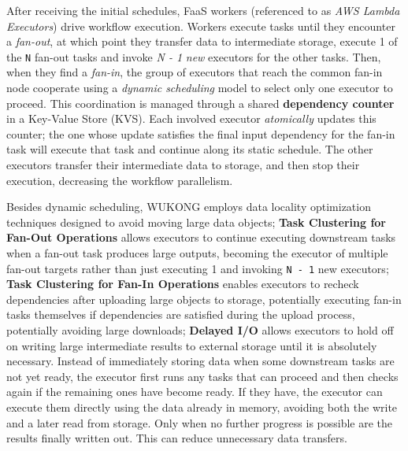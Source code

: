 \begin{itemize}
After receiving the initial schedules, FaaS workers (referenced to as \textit{AWS Lambda Executors}) drive workflow execution. Workers execute tasks until they encounter a \textit{fan-out}, at which point they transfer data to intermediate storage, execute 1 of the \texttt{N} fan-out tasks and invoke \textit{N - 1} \textit{new} executors for the other tasks. Then, when they find a \textit{fan-in}, the group of executors that reach the common fan-in node cooperate using a \textit{dynamic scheduling} model to select only one executor to proceed. This coordination is managed through a shared \textbf{dependency counter} in a Key-Value Store (KVS). Each involved executor \textit{atomically} updates this counter; the one whose update satisfies the final input dependency for the fan-in task will execute that task and continue along its static schedule. The other executors transfer their intermediate data to storage, and then stop their execution, decreasing the workflow parallelism.

Besides dynamic scheduling, WUKONG employs data locality optimization techniques designed to avoid moving large data objects; \textbf{Task Clustering for Fan-Out Operations} allows executors to continue executing downstream tasks when a fan-out task produces large outputs, becoming the executor of multiple fan-out targets rather than just executing 1 and invoking \texttt{N - 1} new executors; \textbf{Task Clustering for Fan-In Operations} enables executors to recheck dependencies after uploading large objects to storage, potentially executing fan-in tasks themselves if dependencies are satisfied during the upload process, potentially avoiding large downloads; \textbf{Delayed I/O} allows executors to hold off on writing large intermediate results to external storage until it is absolutely necessary. Instead of immediately storing data when some downstream tasks are not yet ready, the executor first runs any tasks that can proceed and then checks again if the remaining ones have become ready. If they have, the executor can execute them directly using the data already in memory, avoiding both the write and a later read from storage. Only when no further progress is possible are the results finally written out. This can reduce unnecessary data transfers.


\end{itemize}
